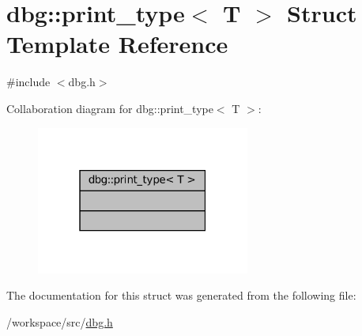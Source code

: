 \hypertarget{structdbg_1_1print__type}{}\section{dbg\+:\+:print\+\_\+type$<$ T $>$ Struct Template Reference}
\label{structdbg_1_1print__type}


{\ttfamily \#include $<$dbg.\+h$>$}



Collaboration diagram for dbg\+:\+:print\+\_\+type$<$ T $>$\+:
\nopagebreak
\begin{figure}[H]
\begin{center}
\leavevmode
\includegraphics[width=199pt]{structdbg_1_1print__type__coll__graph}
\end{center}
\end{figure}


The documentation for this struct was generated from the following file\+:\begin{DoxyCompactItemize}
\item 
/workspace/src/\hyperlink{dbg_8h}{dbg.\+h}\end{DoxyCompactItemize}
